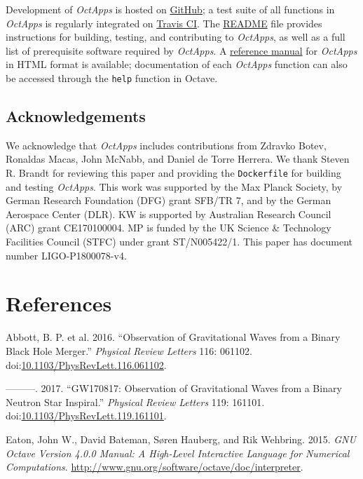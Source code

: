 \documentclass[10pt,a4paper,onecolumn]{article}
\begin{document}
Development of \emph{OctApps} is hosted on
\href{https://github.com/octapps/octapps}{GitHub}; a test suite of all
functions in \emph{OctApps} is regularly integrated on
\href{https://travis-ci.org/octapps/octapps}{Travis CI}. The
\href{https://github.com/octapps/octapps/blob/master/README.md}{README}
file provides instructions for building, testing, and contributing to
\emph{OctApps}, as well as a full list of prerequisite software required
by \emph{OctApps}. A \href{https://octapps.github.io}{reference manual}
for \emph{OctApps} in HTML format is available; documentation of each
\emph{OctApps} function can also be accessed through the \texttt{help}
function in Octave.

\subsection{Acknowledgements}\label{acknowledgements}

We acknowledge that \emph{OctApps} includes contributions from Zdravko
Botev, Ronaldas Macas, John McNabb, and Daniel de Torre Herrera. We
thank Steven R. Brandt for reviewing this paper and providing the
\texttt{Dockerfile} for building and testing \emph{OctApps}. This work
was supported by the Max Planck Society, by German Research Foundation
(DFG) grant SFB/TR 7, and by the German Aerospace Center (DLR). KW is
supported by Australian Research Council (ARC) grant CE170100004. MP is
funded by the UK Science \& Technology Facilities Council (STFC) under
grant ST/N005422/1. This paper has document number LIGO-P1800078-v4.

\section*{References}\label{references}

\hypertarget{refs}{}
\hypertarget{ref-LIGOVirg2016a}{}
Abbott, B. P. et al. 2016. ``Observation of Gravitational Waves from a
Binary Black Hole Merger.'' \emph{Physical Review Letters} 116: 061102.
doi:\href{https://doi.org/10.1103/PhysRevLett.116.061102}{10.1103/PhysRevLett.116.061102}.

\hypertarget{ref-LIGOVirg2017a}{}
---------. 2017. ``GW170817: Observation of Gravitational Waves from a
Binary Neutron Star Inspiral.'' \emph{Physical Review Letters} 119:
161101.
doi:\href{https://doi.org/10.1103/PhysRevLett.119.161101}{10.1103/PhysRevLett.119.161101}.

\hypertarget{ref-Octave2015}{}
Eaton, John W., David Bateman, Søren Hauberg, and Rik Wehbring. 2015.
\emph{GNU Octave Version 4.0.0 Manual: A High-Level Interactive Language
for Numerical Computations}.
\url{http://www.gnu.org/software/octave/doc/interpreter}.
\end{document}
